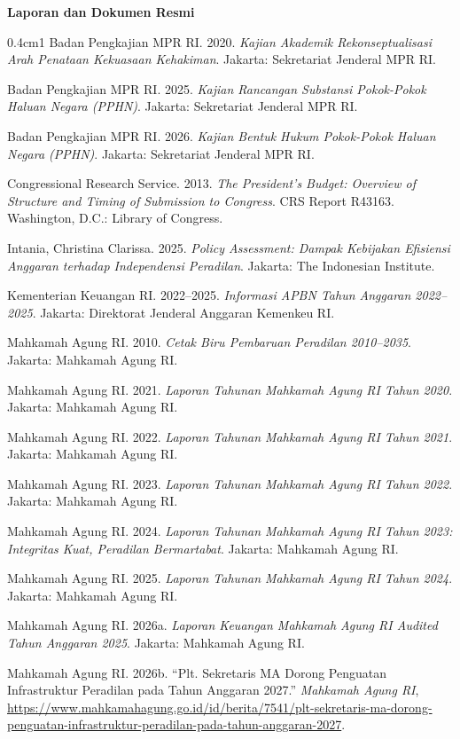 \documentclass[12pt,a4paper,twocolumn]{article}
\begin{document}
\vspace{0.15em}
\noindent \textbf{Laporan dan Dokumen Resmi}
\begin{hangparas}{0.4cm}{1}
    Badan Pengkajian MPR RI. 2020. \textit{Kajian Akademik Rekonseptualisasi Arah Penataan Kekuasaan Kehakiman}. Jakarta: Sekretariat Jenderal MPR RI.

    Badan Pengkajian MPR RI. 2025. \textit{Kajian Rancangan Substansi Pokok-Pokok Haluan Negara (PPHN)}. Jakarta: Sekretariat Jenderal MPR RI.

    Badan Pengkajian MPR RI. 2026. \textit{Kajian Bentuk Hukum Pokok-Pokok Haluan Negara (PPHN)}. Jakarta: Sekretariat Jenderal MPR RI.

    Congressional Research Service. 2013. \textit{The President's Budget: Overview of Structure and Timing of Submission to Congress}. CRS Report R43163. Washington, D.C.: Library of Congress.

    Intania, Christina Clarissa. 2025. \textit{Policy Assessment: Dampak Kebijakan Efisiensi Anggaran terhadap Independensi Peradilan}. Jakarta: The Indonesian Institute.

    Kementerian Keuangan RI. 2022--2025. \textit{Informasi APBN Tahun Anggaran 2022--2025}. Jakarta: Direktorat Jenderal Anggaran Kemenkeu RI.

    Mahkamah Agung RI. 2010. \textit{Cetak Biru Pembaruan Peradilan 2010--2035}. Jakarta: Mahkamah Agung RI.

    Mahkamah Agung RI. 2021. \textit{Laporan Tahunan Mahkamah Agung RI Tahun 2020}. Jakarta: Mahkamah Agung RI.

    Mahkamah Agung RI. 2022. \textit{Laporan Tahunan Mahkamah Agung RI Tahun 2021}. Jakarta: Mahkamah Agung RI.

    Mahkamah Agung RI. 2023. \textit{Laporan Tahunan Mahkamah Agung RI Tahun 2022}. Jakarta: Mahkamah Agung RI.

    Mahkamah Agung RI. 2024. \textit{Laporan Tahunan Mahkamah Agung RI Tahun 2023: Integritas Kuat, Peradilan Bermartabat}. Jakarta: Mahkamah Agung RI.

    Mahkamah Agung RI. 2025. \textit{Laporan Tahunan Mahkamah Agung RI Tahun 2024}. Jakarta: Mahkamah Agung RI.

    Mahkamah Agung RI. 2026a. \textit{Laporan Keuangan Mahkamah Agung RI Audited Tahun Anggaran 2025}. Jakarta: Mahkamah Agung RI.

    Mahkamah Agung RI. 2026b. ``Plt. Sekretaris MA Dorong Penguatan Infrastruktur Peradilan pada Tahun Anggaran 2027.'' \textit{Mahkamah Agung RI}, \url{https://www.mahkamahagung.go.id/id/berita/7541/plt-sekretaris-ma-dorong-penguatan-infrastruktur-peradilan-pada-tahun-anggaran-2027}.
\end{hangparas}
\end{document}
